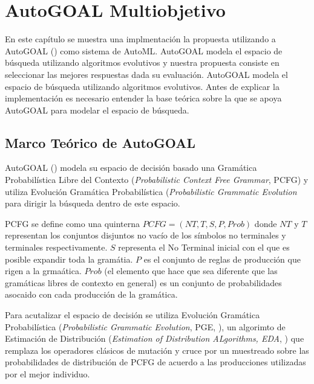 \chapter{AutoGOAL Multiobjetivo}\label{chapter:implementation}
En este cap\'itulo se muestra una implmentaci\'on la propuesta utilizando a AutoGOAL (\cite{estevez2020solving}) como sistema de AutoML. AutoGOAL modela el espacio de b\'usqueda utilizando algoritmos evolutivos y nuestra propuesta consiste en seleccionar las mejores respuestas dada su evaluaci\'on.  AutoGOAL modela el espacio de b\'usqueda utilizando algoritmos evolutivos. Antes de explicar la implementaci\'on es necesario entender la base te\'orica sobre la que se apoya AutoGOAL para modelar el espacio  de b\'usqueda. 

\section{Marco Te\'orico de AutoGOAL}

AutoGOAL (\cite{estevez2020solving}) modela su espacio de decisi\'on basado una Gram\'atica Probabil\'istica  Libre del Contexto (\textit{Probabilistic Context Free Grammar}, PCFG) y utiliza Evoluci\'on Gram\'atica Probabil\'istica (\textit{Probabilistic Grammatic Evolution} para dirigir la b\'usqueda dentro de este espacio. 

PCFG se define como una quinterna $PCFG = (NT, T, S, P, Prob)$ donde $NT$ y $T$ representan los conjuntos disjuntos no vac\'io de los s\'imbolos no terminales y terminales respectivamente. $S$ representa el No Terminal inicial con el que es posible expandir toda la gram\'atia. $P$ es el conjunto de reglas de producci\'on que rigen a la grma\'atica. $Prob$ (el elemento que hace que sea diferente que las gram\'aticas libres de contexto en general) es un conjunto de probabilidades asocaido con cada producci\'on de la gram\'atica. 

Para acutalizar el espacio de decisi\'on  se utiliza Evoluci\'on Gram\'atica Probabil\'istica (\textit{Probabilistic Grammatic Evolution}, PGE, \cite{megane2021probabilistic}), un algorimto de Estimaci\'on de Distribuci\'on (\textit{Estimation of Distribution ALgorithms, EDA}, \cite{larranaga2001estimation}) que remplaza los operadores cl\'asicos de mutaci\'on y cruce por un muestreado sobre las probabilidades de distribuci\'on de PCFG de acuerdo a las producciones utilizadas por el mejor individuo. 

